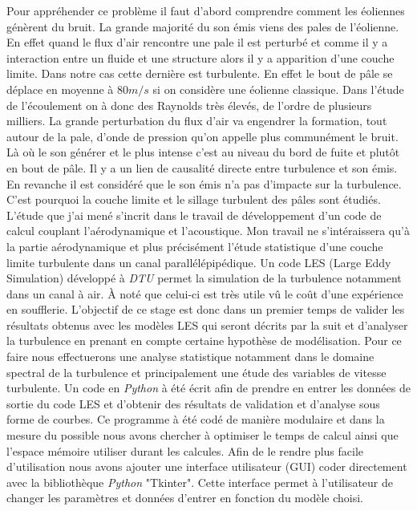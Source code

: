 \documentclass[12pt]{article}
\theoremstyle{plain}
\theoremstyle{remark}
\begin{document}
	Pour appréhender ce problème il faut d'abord comprendre comment les éoliennes génèrent du bruit. La grande majorité du son émis viens des pales de l'éolienne. En effet quand le flux d'air rencontre une pale il est perturbé et comme il y a interaction entre un fluide et une structure alors il y a apparition d'une couche limite. Dans notre cas cette dernière est turbulente. En effet le bout de pâle se déplace en moyenne à $80 m/s$ si on considère une éolienne classique. Dans l'étude de l'écoulement on à donc des Raynolds très élevés, de l'ordre de plusieurs milliers. La grande perturbation du flux d'air va engendrer la formation, tout autour de la pale, d'onde de pression qu'on appelle plus communément le bruit. Là où le son générer et le plus intense c'est au niveau du bord de fuite et plutôt en bout de pâle. Il y a un lien de causalité directe entre turbulence et son émis. En revanche il est considéré que le son émis n'a pas d'impacte sur la turbulence. C'est pourquoi la couche limite et le sillage turbulent des pâles sont étudiés.\\
	
	L'étude que j'ai mené s'incrit dans le travail de développement d'un code de calcul couplant l'aérodynamique et l'acoustique. Mon travail ne s'intéraissera qu'à la partie aérodynamique et plus précisément l'étude statistique d'une couche limite turbulente dans un canal parallélépipédique. Un code LES (Large Eddy Simulation) développé à \textit{DTU} permet la simulation de la turbulence notamment dans un canal à air. À noté que celui-ci est très utile vû le coût d'une expérience en soufflerie. L'objectif de ce stage est donc dans un premier temps de valider les résultats obtenus avec les modèles LES qui seront décrits par la suit et d'analyser la turbulence en prenant en compte certaine hypothèse de modélisation. Pour ce faire nous effectuerons une analyse statistique notamment dans le domaine spectral de la turbulence et principalement une étude des variables de vitesse turbulente. Un code en \textit{Python} à été écrit afin de prendre en entrer les données de sortie du code LES et d'obtenir des résultats de validation et d'analyse sous forme de courbes. Ce programme à été codé de manière modulaire et dans la mesure du possible nous avons chercher à optimiser le temps de calcul ainsi que l'espace mémoire utiliser durant les calcules. Afin de le rendre plus facile d'utilisation nous avons ajouter une interface utilisateur (GUI) coder directement avec la bibliothèque \textit{Python} "Tkinter". Cette interface permet à l'utilisateur de changer les paramètres et données d'entrer en fonction du modèle choisi.\\
	
\end{document}
